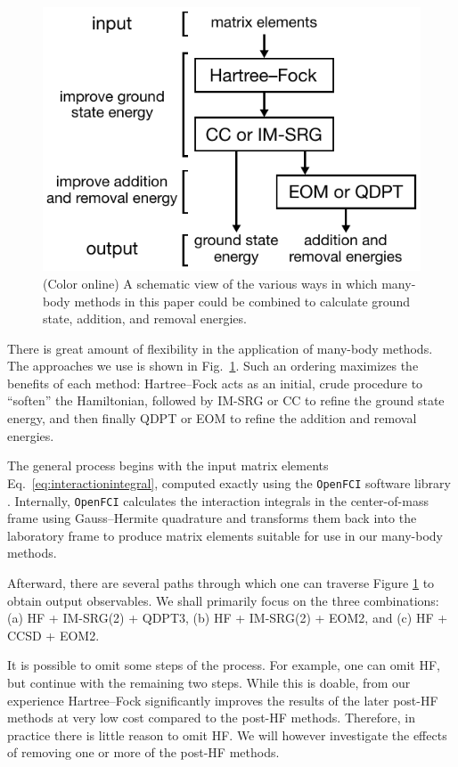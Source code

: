 \begin{figure}
  \centering
  \includegraphics{figures/fig-methods.pdf}
  \caption{(Color online) A schematic view of the various ways in which many-body methods in this paper could be combined to calculate ground state, addition, and removal energies.}
  \label{fig:methods}
\end{figure}

There is great amount of flexibility in the application of many-body methods.  The approaches we use is shown in Fig.\ \ref{fig:methods}.  Such an ordering maximizes the benefits of each method: Hartree--Fock acts as an initial, crude procedure to ``soften'' the Hamiltonian, followed by IM-SRG or CC to refine the ground state energy, and then finally QDPT or EOM to refine the addition and removal energies.

The general process begins with the input matrix elements Eq.\ \eqref{eq:interactionintegral}, computed exactly using the \texttt{OpenFCI} software library \cite{2008arXiv0810.2644K}.  Internally, \texttt{OpenFCI} calculates the interaction integrals in the center-of-mass frame using Gauss--Hermite quadrature and transforms them back into the laboratory frame to produce matrix elements suitable for use in our many-body methods.

Afterward, there are several paths through which one can traverse Figure \ref{fig:methods} to obtain output observables.  We shall primarily focus on the three combinations: (a) HF + IM-SRG(2) + QDPT3, (b) HF + IM-SRG(2) + EOM2, and (c) HF + CCSD + EOM2.

It is possible to omit some steps of the process.  For example, one can omit HF, but continue with the remaining two steps.  While this is doable, from our experience Hartree--Fock significantly improves the results of the later post-HF methods at very low cost compared to the post-HF methods.  Therefore, in practice there is little reason to omit HF.  We will however investigate the effects of removing one or more of the post-HF methods.

